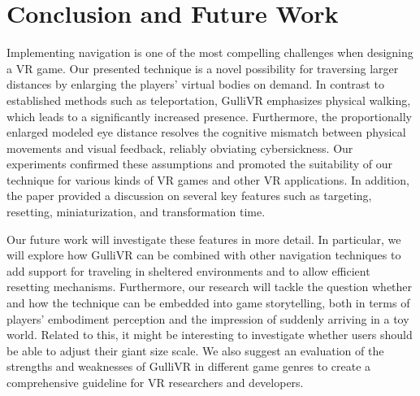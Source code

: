\documentclass{sigchi}
\begin{document}
\section{Conclusion and Future Work}

Implementing navigation is one of the most compelling challenges when designing a VR game. Our presented technique is a novel possibility for traversing larger distances by enlarging the players' virtual bodies on demand. In contrast to established methods such as teleportation, GulliVR emphasizes physical walking, which leads to a significantly increased presence. Furthermore, the proportionally enlarged modeled eye distance resolves the cognitive mismatch between physical movements and visual feedback, reliably obviating cybersickness. Our experiments confirmed these assumptions and promoted the suitability of our technique for various kinds of VR games and other VR applications. In addition, the paper provided a discussion on several key features such as targeting, resetting, miniaturization, and transformation time.

Our future work will investigate these features in more detail. In particular, we will explore how GulliVR can be combined with other navigation techniques to add support for traveling in sheltered environments and to allow efficient resetting mechanisms. Furthermore, our research will tackle the question whether and how the technique can be embedded into game storytelling, both in terms of players' embodiment perception and the impression of suddenly arriving in a toy world. Related to this, it might be interesting to investigate whether users should be able to adjust their giant size scale. We also suggest an evaluation of the strengths and weaknesses of GulliVR in different game genres to create a comprehensive guideline for VR researchers and developers.


\balance{}



\end{document}

